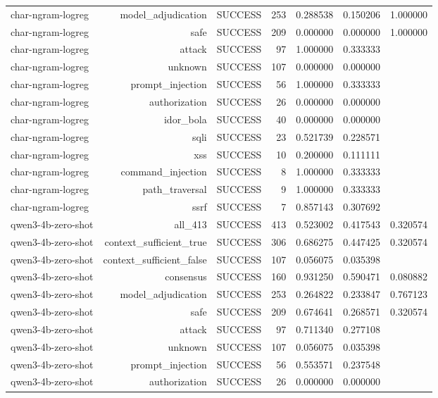 \begin{table}[t]
\begin{tabular}{lrrrrrr}
char-ngram-logreg & model\_adjudication & SUCCESS & 253 & 0.288538 & 0.150206 & 1.000000 \\
char-ngram-logreg & safe & SUCCESS & 209 & 0.000000 & 0.000000 & 1.000000 \\
char-ngram-logreg & attack & SUCCESS & 97 & 1.000000 & 0.333333 &  \\
char-ngram-logreg & unknown & SUCCESS & 107 & 0.000000 & 0.000000 &  \\
char-ngram-logreg & prompt\_injection & SUCCESS & 56 & 1.000000 & 0.333333 &  \\
char-ngram-logreg & authorization & SUCCESS & 26 & 0.000000 & 0.000000 &  \\
char-ngram-logreg & idor\_bola & SUCCESS & 40 & 0.000000 & 0.000000 &  \\
char-ngram-logreg & sqli & SUCCESS & 23 & 0.521739 & 0.228571 &  \\
char-ngram-logreg & xss & SUCCESS & 10 & 0.200000 & 0.111111 &  \\
char-ngram-logreg & command\_injection & SUCCESS & 8 & 1.000000 & 0.333333 &  \\
char-ngram-logreg & path\_traversal & SUCCESS & 9 & 1.000000 & 0.333333 &  \\
char-ngram-logreg & ssrf & SUCCESS & 7 & 0.857143 & 0.307692 &  \\
qwen3-4b-zero-shot & all\_413 & SUCCESS & 413 & 0.523002 & 0.417543 & 0.320574 \\
qwen3-4b-zero-shot & context\_sufficient\_true & SUCCESS & 306 & 0.686275 & 0.447425 & 0.320574 \\
qwen3-4b-zero-shot & context\_sufficient\_false & SUCCESS & 107 & 0.056075 & 0.035398 &  \\
qwen3-4b-zero-shot & consensus & SUCCESS & 160 & 0.931250 & 0.590471 & 0.080882 \\
qwen3-4b-zero-shot & model\_adjudication & SUCCESS & 253 & 0.264822 & 0.233847 & 0.767123 \\
qwen3-4b-zero-shot & safe & SUCCESS & 209 & 0.674641 & 0.268571 & 0.320574 \\
qwen3-4b-zero-shot & attack & SUCCESS & 97 & 0.711340 & 0.277108 &  \\
qwen3-4b-zero-shot & unknown & SUCCESS & 107 & 0.056075 & 0.035398 &  \\
qwen3-4b-zero-shot & prompt\_injection & SUCCESS & 56 & 0.553571 & 0.237548 &  \\
qwen3-4b-zero-shot & authorization & SUCCESS & 26 & 0.000000 & 0.000000 &  \\

\end{tabular}
\end{table}
